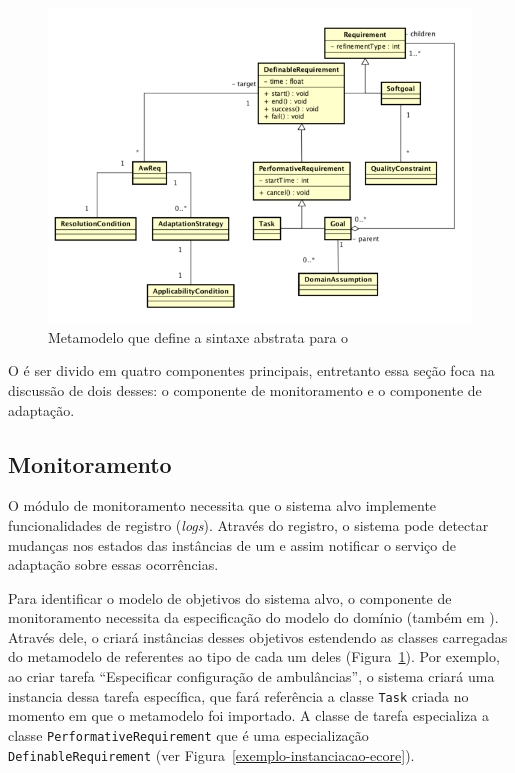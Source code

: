 \begin{figure}[h]
	\centering
	\includegraphics[width=1\textwidth]{figuras/metamodelos/metamodelo-zanshin-antigo.png}
	\caption{Metamodelo que define a sintaxe abstrata para o \zanshin}
	\label{figura-metamodelo-antigo}
\end{figure}

O \zanshin é ser divido em quatro componentes principais, entretanto essa seção foca na discussão de dois desses: o componente de monitoramento e o componente de adaptação.

\subsection{Monitoramento}
\label{sec-referencial-zanshin-monitoramento}

O módulo de monitoramento necessita que o sistema alvo implemente funcionalidades de registro (\textit{logs}). Através do registro, o sistema pode detectar mudanças nos estados das instâncias de um \awreq e assim notificar o serviço de adaptação sobre essas ocorrências. 

Para identificar o modelo de objetivos do sistema alvo, o componente de monitoramento necessita da especificação do modelo do domínio (também em \ecore). Através dele, o \zanshin criará instâncias desses objetivos estendendo as classes carregadas do metamodelo de \gore referentes ao tipo de cada um deles (Figura~\ref{figura-metamodelo-antigo}). Por exemplo, ao criar tarefa ``Especificar configuração de ambulâncias'', o sistema criará uma instancia dessa tarefa específica, que fará referência a classe \texttt{Task} criada no momento em que o metamodelo foi importado. A classe de tarefa especializa a classe \texttt{PerformativeRequirement} que é uma especialização \texttt{DefinableRequirement} (ver Figura~\ref{exemplo-instanciacao-ecore}). 

